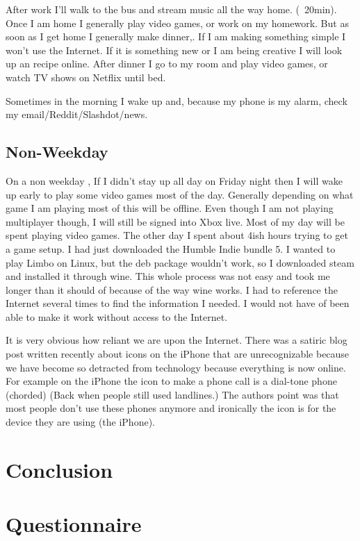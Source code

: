 \documentclass[12pt,letterpaper]{article}
\begin{document}
After work I'll walk to the bus and stream music all the way home.
(~20min). Once I am home I generally play video games, or work on my
homework. But as soon as I get home I generally make dinner,. If I am
making something simple I won't use the Internet. If it is something new
or I am being creative I will look up an recipe online. After dinner I
go to my room and play video games, or watch TV shows on Netflix until
bed.

Sometimes in the morning I wake up and, because my phone is my alarm,
check my email/Reddit/Slashdot/news.


\subsection{Non-Weekday}

On a non weekday , If I didn't stay up all day on Friday night then I
will wake up early to play some video games most of the day. Generally
depending on what game I am playing most of this will be offline. Even
though I am not playing multiplayer though, I will still be signed into
Xbox live. Most of my day will be spent playing video games. The other
day I spent about 4ish hours trying to get a game setup. I had just
downloaded the Humble Indie bundle 5. I wanted to play Limbo on Linux, but
the deb package wouldn't work, so I downloaded steam and installed it
through wine. This whole process was not easy and took me longer than it
should of because of the way wine works. I had to reference the Internet
several times to find the information I needed. I would not have of been
able to make it work without access to the Internet.

It is very obvious how reliant we are upon the Internet. There was a
satiric blog post written recently about icons on the iPhone that are
unrecognizable because we have become so detracted from technology
because everything is now online. For example on the iPhone the icon to
make a phone call is a dial-tone phone (chorded) (Back when people still
used landlines.)  The authors point was that most people don't use these
phones anymore and ironically the icon is for the device they are using
(the iPhone).


\section{Conclusion}

\section{Questionnaire}
\end{document}
